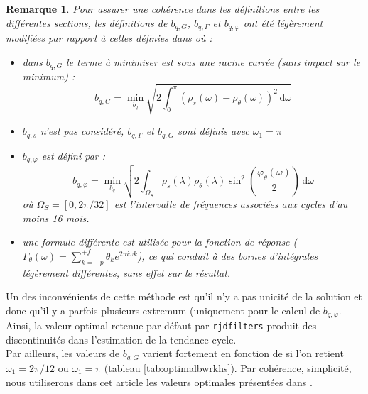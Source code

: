 \documentclass[
  12pt,
  french,
  12pt,a4paper]{article}
\newcommand\1{\mathds{1}}
\newcommand\ud{\,\mathrm{d}}
\newtheorem*{remarque}{Remarque}
\begin{document}
\begin{remarque}

Pour assurer une cohérence dans les définitions entre les différentes sections, les définitions de \(b_{q,G}\), \(b_{q,\Gamma}\) et \(b_{q,\varphi}\) ont été légèrement modifiées par rapport à celles définies dans \textcite{dagumbianconcini2015new} où :

\begin{itemize}
\item
  dans \(b_{q,G}\) le terme à minimiser est sous une racine carrée (sans impact sur le minimum) :
  \[
  b_{q,G}=\underset{b_q}{\min}\sqrt{
  2\int_{0}^{\pi}
  \left(\rho_s(\omega)-\rho_\theta(\omega)\right)^{2}\ud \omega}
  \]
\item
  \(b_{q,s}\) n'est pas considéré, \(b_{q,\Gamma}\) et \(b_{q,G}\) sont définis avec \(\omega_1=\pi\)
\item
  \(b_{q,\varphi}\) est défini par :
  \[
  b_{q,\varphi}=\underset{b_q}{\min}
  \sqrt{2\int_{\Omega_S}
  \rho_s(\lambda)\rho_\theta(\lambda)\sin^{2}\left(\frac{\varphi_\theta(\omega)}{2}\right)\ud \omega}
  \]
  où \(\Omega_S=[0,2\pi/32]\) est l'intervalle de fréquences associées aux cycles d'au moins 16 mois.
\item
  une formule différente est utilisée pour la fonction de réponse (\(\Gamma_\theta(\omega)=\sum_{k=-p}^{+f} \theta_k e^{2\pi i \omega k}\)), ce qui conduit à des bornes d'intégrales légèrement différentes, sans effet sur le résultat.
\end{itemize}

\end{remarque}

Un des inconvénients de cette méthode est qu'il n'y a pas unicité de la solution et donc qu'il y a parfois plusieurs extremum (uniquement pour le calcul de \(b_{q,\varphi}\).
Ainsi, la valeur optimal retenue par défaut par \texttt{rjdfilters} produit des discontinuités dans l'estimation de la tendance-cycle.\\
Par ailleurs, les valeurs de \(b_{q,G}\) varient fortement en fonction de si l'on retient \(\omega_1=2\pi/12\) ou \(\omega_1=\pi\) (tableau \ref{tab:optimalbwrkhs}).
Par cohérence, simplicité, nous utiliserons dans cet article les valeurs optimales présentées dans \textcite{dagumbianconcini2015new}.
\end{document}
